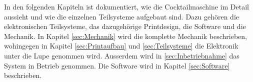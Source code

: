 In den folgenden Kapiteln ist dokumentiert, wie die Cocktailmaschine im Detail aussieht und wie die einzelnen Teilsysteme aufgebaut sind. Dazu gehören die elektronischen Teilsysteme, das dazugehörige Printdesign, die Software und die Mechanik. In Kapitel \ref{sec:Mechanik} wird die komplette Mechanik beschrieben, wohingegen in Kapitel \ref{sec:Printaufbau} und \ref{sec:Teilsysteme} die Elektronik unter die Lupe genommen wird. Ausserdem wird in \ref{sec:Inbetriebnahme} das  System in Betrieb genommen. Die Software wird in Kapitel \ref{sec:Software} beschrieben. 